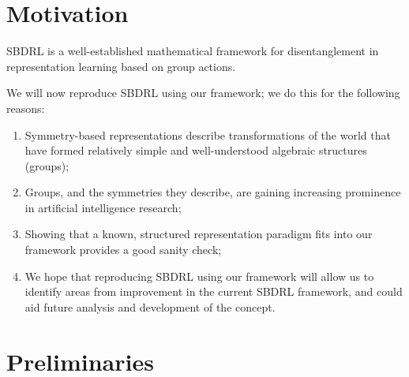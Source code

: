 \section{Motivation}

SBDRL is a well-established mathematical framework for disentanglement in representation learning based on group actions.


We will now reproduce SBDRL using our framework; we do this for the following reasons:
\begin{enumerate}[(1)]
    \item Symmetry-based representations describe transformations of the world that have formed relatively simple and well-understood algebraic structures (groups);
    \item Groups, and the symmetries they describe, are gaining increasing prominence in artificial intelligence research;
    \item Showing that a known, structured representation paradigm fits into our framework provides a good sanity check;
    \item We hope that reproducing SBDRL using our framework will allow us to identify areas from improvement in the current SBDRL framework, and could aid future analysis and development of the concept.
\end{enumerate}


\section{Preliminaries}

